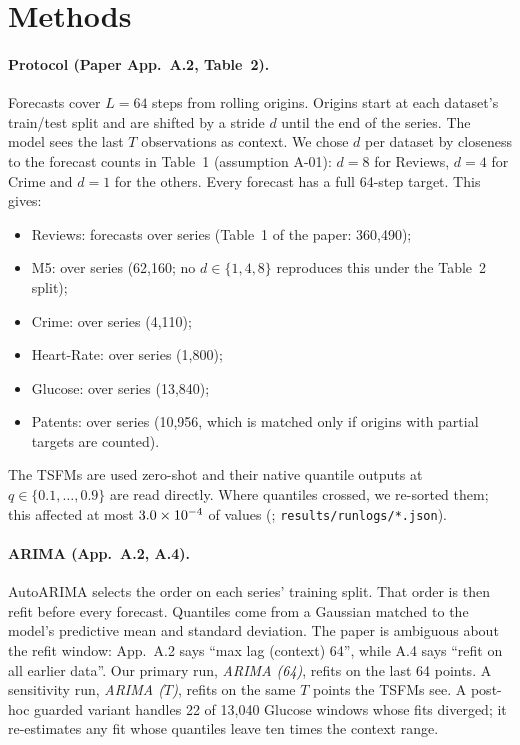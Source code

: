 \section{Methods}

\paragraph{Protocol (Paper App.~A.2, Table~2).} Forecasts cover $L{=}64$ steps from rolling origins. Origins start at
each dataset's train/test split and are shifted by a stride $d$ until the end of the series. The model sees the
last $T$ observations as context. We chose $d$ per dataset by closeness to the forecast counts in
Table~1 (assumption A-01): $d{=}8$ for Reviews, $d{=}4$ for Crime and $d{=}1$ for the others. Every forecast has a
full 64-step target. This gives:
\begin{itemize}
\item Reviews: \nwinRev{} forecasts over \nserRev{} series (Table~1 of the paper: 360,490);
\item M5: \nwinMfive{} over \nserMfive{} series (62,160; no $d\in\{1,4,8\}$ reproduces this under the Table~2 split);
\item Crime: \nwinCrime{} over \nserCrime{} series (4,110);
\item Heart-Rate: \nwinHR{} over \nserHR{} series (1,800);
\item Glucose: \nwinGlucose{} over \nserGlucose{} series (13,840);
\item Patents: \nwinPat{} over \nserPat{} series (10,956, which is matched only if origins with partial
targets are counted).
\end{itemize}
The TSFMs are used zero-shot and their native quantile outputs at $q\in\{0.1,\dots,0.9\}$ are read directly.
Where quantiles crossed, we re-sorted them; this affected at most $3.0\times10^{-4}$ of values
(\maxCrossWhere; \texttt{results/runlogs/*.json}).

\paragraph{ARIMA (App.~A.2, A.4).} AutoARIMA selects the order on each series' training split. That order is then
refit before every forecast. Quantiles come from a Gaussian matched to the model's predictive mean and standard
deviation. The paper is ambiguous about the refit window: App.~A.2 says ``max lag (context) 64'', while A.4 says
``refit on all earlier data''. Our primary run, \emph{ARIMA (64)}, refits on the last 64 points. A sensitivity run,
\emph{ARIMA ($T$)}, refits on the same $T$ points the TSFMs see. A post-hoc guarded variant handles 22 of
13{,}040 Glucose windows whose fits diverged; it re-estimates any fit whose quantiles leave ten times the
context range.

